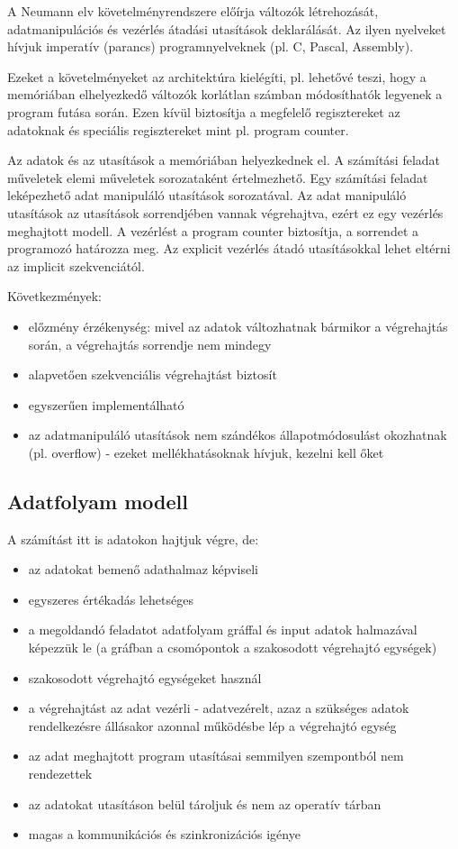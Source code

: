 A Neumann elv követelményrendszere előírja változók létrehozását, adatmanipulációs és vezérlés átadási utasítások deklarálását.
Az ilyen nyelveket hívjuk imperatív (parancs) programnyelveknek (pl. C, Pascal, Assembly).

Ezeket a követelményeket az architektúra kielégíti, pl. lehetővé teszi, hogy a memóriában elhelyezkedő változók korlátlan számban módosíthatók legyenek a program futása során.
Ezen kívül biztosítja a megfelelő regisztereket az adatoknak és speciális regisztereket mint pl. program counter.

Az adatok és az utasítások a memóriában helyezkednek el.
A számítási feladat műveletek elemi műveletek sorozataként értelmezhető.
Egy számítási feladat leképezhető adat manipuláló utasítások sorozatával.
Az adat manipuláló utasítások az utasítások sorrendjében vannak végrehajtva, ezért ez egy vezérlés meghajtott modell.
A vezérlést a program counter biztosítja, a sorrendet a programozó határozza meg.
Az explicit vezérlés átadó utasításokkal lehet eltérni az implicit szekvenciától.

Következmények:
\begin{itemize}
    \item előzmény érzékenység: mivel az adatok változhatnak bármikor a végrehajtás során, a végrehajtás sorrendje nem mindegy
    \item alapvetően szekvenciális végrehajtást biztosít
    \item egyszerűen implementálható
    \item az adatmanipuláló utasítások nem szándékos állapotmódosulást okozhatnak (pl. overflow) - ezeket mellékhatásoknak hívjuk, kezelni kell őket
\end{itemize}

\subsection{Adatfolyam modell}
A számítást itt is adatokon hajtjuk végre, de:
\begin{itemize}
    \item az adatokat bemenő adathalmaz képviseli
    \item egyszeres értékadás lehetséges
    \item a megoldandó feladatot adatfolyam gráffal és input adatok halmazával képezzük le (a gráfban a csomópontok a szakosodott végrehajtó egységek)
    \item szakosodott végrehajtó egységeket használ
    \item a végrehajtást az adat vezérli - adatvezérelt, azaz a szükséges adatok rendelkezésre állásakor azonnal működésbe lép a végrehajtó egység
    \item az adat meghajtott program utasításai semmilyen szempontból nem rendezettek
    \item az adatokat utasításon belül tároljuk és nem az operatív tárban
    \item magas a kommunikációs és szinkronizációs igénye
\end{itemize}

